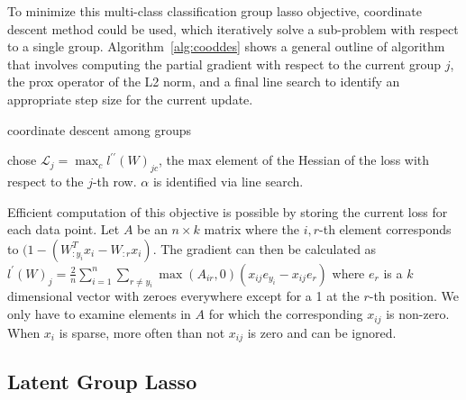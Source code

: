 \documentclass[11pt]{article}
\begin{document}
To minimize this multi-class classification group lasso objective, coordinate descent method could be used, which iteratively solve a sub-problem with respect to a 
single group. Algorithm~\ref{alg:cooddes} shows a general outline of algorithm that involves
computing the partial gradient with respect to the 
current group $j$, the prox
operator of the L2 norm, and a final line search to identify an appropriate
step size for the current update.

\begin{algorithm}
\caption{coordinate descent among groups}
\label{alg:cooddes}
\end{algorithm}

\cite{blondel2013block} chose 
$\mathcal{L}_j = \max_c l^{\prime\prime}(W)_{jc}$, the max element of the
Hessian of the loss with respect to the $j$-th row. $\alpha$ is identified
via line search.

Efficient computation of this objective is possible by storing the current 
loss for each data point. Let $A$ be an $n\times k$ matrix where the 
$i,r$-th element corresponds to 
 $(1-(W_{:y_i}^Tx_i - W_{:r}x_i).$
 The gradient can then be calculated as 
 $l^\prime(W)_{j} = \frac{2}{n}\sum_{i=1}^n\sum_{r\ne y_i}
 \max(A_{ir}, 0)(x_{ij}e_{y_i} - x_{ij} e_r)$
where $e_r$ is a $k$ dimensional vector with zeroes everywhere except for a 1
at the $r$-th position. We only have to examine elements in $A$ for which 
the corresponding $x_{ij}$ is non-zero. When $x_{i}$ is sparse, more often
than not $x_{ij}$ is zero and can be ignored.

\subsection{Latent Group Lasso}
\end{document}

